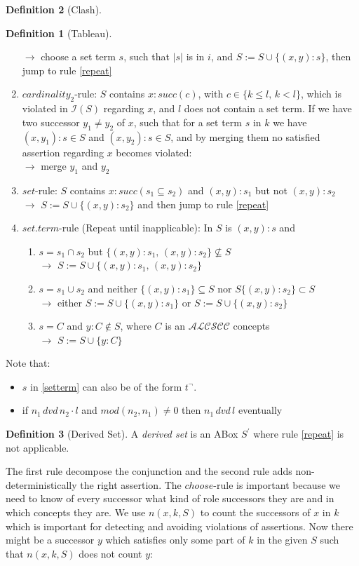 \documentclass[a4paper,11pt]{scrartcl}
\theoremstyle{break}
\theoremstyle{definition}
\newtheorem{mydef}{Definition}
\begin{document}
\begin{mydef}[Clash]
\begin{mydef}[Tableau]
\begin{enumerate}
$\rightarrow$ choose a set term $s$, such that $|s|$ is in $i$, and $S:=S\cup\{(x,y):s\}$, then jump to rule \ref{repeat}
\item\label{exceeded}$cardinality_2$-rule: $S$ contains $x:succ(c)$, with $c\in\{k\leq l,\,k<l\}$, which is violated in $\mathcal{I}(S)$ regarding $x$, and $l$ does not contain a set term. If we have two successor $y_1\neq y_2$ of $x$, such that for a set term $s$ in $k$ we have $(x,y_1):s\in S$ and $(x,y_2):s\in S$, and by merging them no satisfied assertion regarding $x$ becomes violated:\\
$\rightarrow$ merge $y_1$ and $y_2$ 
\item\label{s}$set$-rule: $S$ contains $x:succ(s_1\subseteq s_2)$ and $(x,y):s_1$ but not $(x,y):s_2$\\
$\rightarrow$ $S:=S\cup\{(x,y):s_2\}$ and then jump to rule \ref{repeat}
\item\label{repeat} $set.term$-rule (Repeat until inapplicable): In $S$ is $(x,y):s$ and
\begin{enumerate}
\item\label{setterm1} $s=s_1\cap s_2$ but $\{(x,y):s_1,\,(x,y):s_2\}\not\subseteq S$\\
$\rightarrow$ $S:=S\cup \{(x,y):s_1,\,(x,y):s_2\}$ 
\item\label{setterm2} $s=s_1\cup s_2$ and neither $\{(x,y):s_1\}\subseteq S$ nor $S\{(x,y):s_2\}\subset S$\\
$\rightarrow$ either $S:=S\cup \{(x,y):s_1\}$ or $S:=S\cup \{(x,y):s_2\}$ 
\item\label{setterm3} $s=C$ and $y:C\notin S$, where $C$ is an $\mathcal{ALCSCC}$ concepts\\
$\rightarrow$ $S:=S\cup\{y:C\}$
\end{enumerate}
\end{enumerate}
\end{mydef}
Note that:
\begin{itemize}
\item $s$ in \ref{setterm} can also be of the form $t^\neg$.
\item if  $n_1\,dvd\,n_2\cdot l$ and $mod(n_2,n_1)\neq 0$ then $n_1\,dvd\,l$ eventually
\end{itemize}
\end{mydef}
\begin{mydef}[Derived Set]
A \textit{derived set} is an ABox $S^\prime$ where rule \ref{repeat} is not applicable.
\end{mydef}
The first rule decompose the conjunction and the second rule adds non-deterministically the right assertion. The $choose$-rule is important because we need to know of every successor what kind of role successors they are and in which concepts they are. We use $n(x,k,S)$ to count the successors of $x$ in $k$ which is important for detecting and avoiding violations of assertions. Now there might be a successor $y$ which satisfies only some part of $k$ in the given $S$ such that $n(x,k,S)$ does not count $y$:
\end{document}
